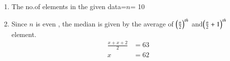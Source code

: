 \renewcommand{\theequation}{\theenumi}
\begin{enumerate}[label=\thesection.\arabic*.,ref=\thesection.\theenumi]
\item The no.of elements in the given data=$n$= 10
\item Since $n$ is even , the median is given by the average of $\left(\frac{n}{2}\right)^{th}$ and$\left(\frac{n}{2}+1\right)^{th}$ element.
\begin{align}
\frac{x+x+2}{2}&= 63\\
x&= 62
\end{align}
\end{enumerate}